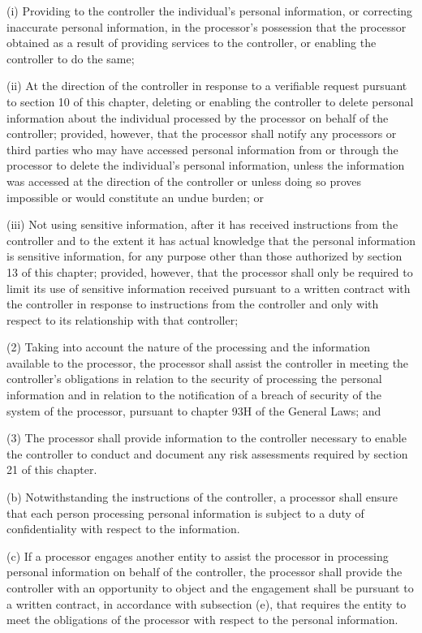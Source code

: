 (i) Providing to the controller the individual’s personal information, or correcting inaccurate personal information, in the processor’s possession that the processor obtained as a result of providing services to the controller, or enabling the controller to do the same;

(ii) At the direction of the controller in response to a verifiable request pursuant to section 10 of this chapter, deleting or enabling the controller to delete personal information about the individual processed by the processor on behalf of the controller; provided, however, that the processor shall notify any processors or third parties who may have accessed personal information from or through the processor to delete the individual’s personal information, unless the information was accessed at the direction of the controller or unless doing so proves impossible or would constitute an undue burden; or

(iii) Not using sensitive information, after it has received instructions from the controller and to the extent it has actual knowledge that the personal information is sensitive information, for any purpose other than those authorized by section 13 of this chapter; provided, however, that the processor shall only be required to limit its use of sensitive information received pursuant to a written contract with the controller in response to instructions from the controller and only with respect to its relationship with that controller;

(2) Taking into account the nature of the processing and the information available to the processor, the processor shall assist the controller in meeting the controller’s obligations in relation to the security of processing the personal information and in relation to the notification of a breach of security of the system of the processor, pursuant to chapter 93H of the General Laws; and

(3) The processor shall provide information to the controller necessary to enable the controller to conduct and document any risk assessments required by section 21 of this chapter.

(b) Notwithstanding the instructions of the controller, a processor shall ensure that each person processing personal information is subject to a duty of confidentiality with respect to the information.

(c) If a processor engages another entity to assist the processor in processing personal information on behalf of the controller, the processor shall provide the controller with an opportunity to object and the engagement shall be pursuant to a written contract, in accordance with subsection (e), that requires the entity to meet the obligations of the processor with respect to the personal information.

